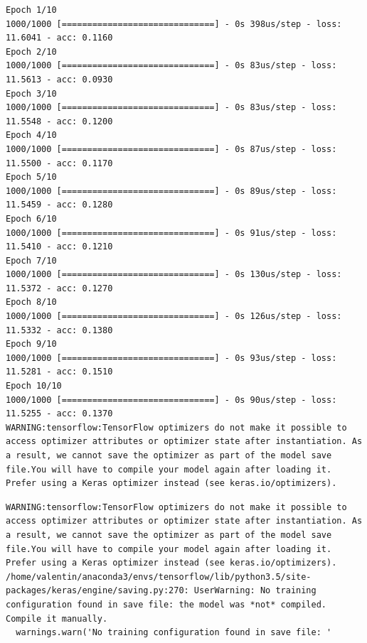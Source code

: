 \documentclass[11pt]{article}
\begin{document}
    \begin{Verbatim}[commandchars=\\\{\}]
Epoch 1/10
1000/1000 [==============================] - 0s 398us/step - loss: 11.6041 - acc: 0.1160
Epoch 2/10
1000/1000 [==============================] - 0s 83us/step - loss: 11.5613 - acc: 0.0930
Epoch 3/10
1000/1000 [==============================] - 0s 83us/step - loss: 11.5548 - acc: 0.1200
Epoch 4/10
1000/1000 [==============================] - 0s 87us/step - loss: 11.5500 - acc: 0.1170
Epoch 5/10
1000/1000 [==============================] - 0s 89us/step - loss: 11.5459 - acc: 0.1280
Epoch 6/10
1000/1000 [==============================] - 0s 91us/step - loss: 11.5410 - acc: 0.1210
Epoch 7/10
1000/1000 [==============================] - 0s 130us/step - loss: 11.5372 - acc: 0.1270
Epoch 8/10
1000/1000 [==============================] - 0s 126us/step - loss: 11.5332 - acc: 0.1380
Epoch 9/10
1000/1000 [==============================] - 0s 93us/step - loss: 11.5281 - acc: 0.1510
Epoch 10/10
1000/1000 [==============================] - 0s 90us/step - loss: 11.5255 - acc: 0.1370
WARNING:tensorflow:TensorFlow optimizers do not make it possible to access optimizer attributes or optimizer state after instantiation. As a result, we cannot save the optimizer as part of the model save file.You will have to compile your model again after loading it. Prefer using a Keras optimizer instead (see keras.io/optimizers).

    \end{Verbatim}

    \begin{Verbatim}[commandchars=\\\{\}]
WARNING:tensorflow:TensorFlow optimizers do not make it possible to access optimizer attributes or optimizer state after instantiation. As a result, we cannot save the optimizer as part of the model save file.You will have to compile your model again after loading it. Prefer using a Keras optimizer instead (see keras.io/optimizers).
/home/valentin/anaconda3/envs/tensorflow/lib/python3.5/site-packages/keras/engine/saving.py:270: UserWarning: No training configuration found in save file: the model was *not* compiled. Compile it manually.
  warnings.warn('No training configuration found in save file: '

    \end{Verbatim}


    
    
    
    
\end{document}
